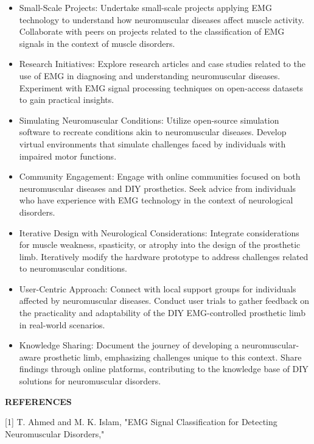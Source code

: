 \documentclass[ 12pt,a4paper,twocolumn,fleqn]{report}
\begin{document}
\begin{itemize}
    \item Small-Scale Projects: Undertake small-scale projects applying EMG technology to understand
how neuromuscular diseases affect muscle activity. Collaborate with peers on projects related
to the classification of EMG signals in the context of muscle disorders.
\item Research Initiatives: Explore research articles and case studies related to the use of EMG in
diagnosing and understanding neuromuscular diseases. Experiment with EMG signal
processing techniques on open-access datasets to gain practical insights.
\item Simulating Neuromuscular Conditions: Utilize open-source simulation software to recreate
conditions akin to neuromuscular diseases. Develop virtual environments that simulate
challenges faced by individuals with impaired motor functions.
\item Community Engagement: Engage with online communities focused on both neuromuscular
diseases and DIY prosthetics. Seek advice from individuals who have experience with EMG
technology in the context of neurological disorders.

\item Iterative Design with Neurological Considerations: Integrate considerations for muscle
weakness, spasticity, or atrophy into the design of the prosthetic limb. Iteratively modify the
hardware prototype to address challenges related to neuromuscular conditions.
\item User-Centric Approach: Connect with local support groups for individuals affected by
neuromuscular diseases. Conduct user trials to gather feedback on the practicality and
adaptability of the DIY EMG-controlled prosthetic limb in real-world scenarios.
\item Knowledge Sharing: Document the journey of developing a neuromuscular-aware prosthetic
limb, emphasizing challenges unique to this context. Share findings through online platforms,
contributing to the knowledge base of DIY solutions for neuromuscular disorders.
\end{itemize}
\newpage
  \pagestyle{fancy}
\thisfancypage{%
  \setlength{\fboxsep}{20pt}\doublebox}{}
\begin{center}

    \huge\textbf{REFERENCES}
\end{center}
\vspace{10mm}
\normalsize
[1] T. Ahmed and M. K. Islam, "EMG Signal Classification for Detecting Neuromuscular Disorders,"
\end{document}
